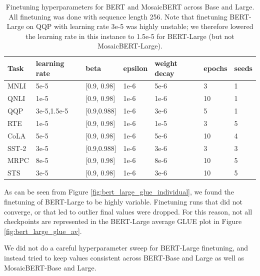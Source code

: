 \begin{table}[h!]
\begin{tabular}{p{1.5cm} p{2cm} p{2.0cm} p{1.5cm} p{} p{1.0cm} p{1.0cm} }
\toprule
Task & learning rate & beta & epsilon & weight decay & epochs & seeds \\ \hline
MNLI & 5e-5 & [0.9, 0.98] & 1e-6 & 5e-6 & 3 & 1 \\
QNLI & 1e-5 & [0.9, 0.98] & 1e-6 & 1e-6 & 10 & 1 \\
QQP & 3e-5,1.5e-5 & [0.9,0.988] & 1e-6 & 3e-6 & 5 & 1\\
RTE & 1e-5 & [0.9, 0.98] & 1e-6 & 1e-5 & 3 & 5\\
CoLA & 5e-5 & [0.9, 0.98] & 1e-6 & 5e-6 & 10 & 4 \\
SST-2 & 3e-5 & [0.9,0.988] & 1e-6 & 3e-6 & 3 & 3 \\
MRPC & 8e-5 & [0.9, 0.98] & 1e-6 & 8e-6 & 10 & 5 \\ 
STS & 3e-5 & [0.9, 0.98] & 1e-6& 3e-6 & 10 & 5 \\
\bottomrule
\end{tabular}
\caption{Finetuning hyperparameters for BERT and MosaicBERT across Base and Large. All finetuning was done with sequence length 256. Note that finetuning BERT-Large on QQP with learning rate 3e-5 was highly unstable; we therefore lowered the learning rate in this instance to 1.5e-5 for BERT-Large (but not MosaicBERT-Large).}
\label{tab:finetuning_hyperparameters}
\end{table}

As can be seen from Figure \ref{fig:bert_large_glue_individual}, we found the finetuning of BERT-Large to be highly variable. Finetuning runs that did not converge, or that led to outlier final values were dropped. For this reason, not all checkpoints are represented in the BERT-Large average GLUE plot in Figure \ref{fig:bert_large_glue_av}.

We did not do a careful hyperparameter sweep for BERT-Large finetuning, and instead tried to keep values consistent across BERT-Base and Large as well as MosaicBERT-Base and Large.

